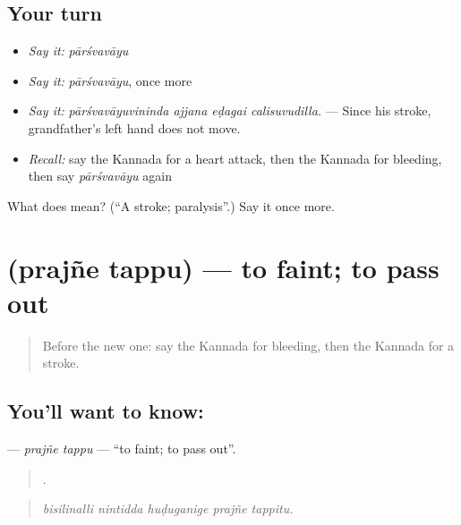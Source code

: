 \subsection*{Your turn}
\begin{itemize}
\raggedright
  \item \emph{Say it:} \emph{pārśvavāyu}
  \item \emph{Say it:} \emph{pārśvavāyu}, once more
  \item \emph{Say it:} \emph{pārśvavāyuvininda ajjana eḍagai calisuvudilla.} — Since his stroke, grandfather's left hand does not move.
  \item \emph{Recall:} say the Kannada for a heart attack, then the Kannada for bleeding, then say \emph{pārśvavāyu} again
\end{itemize}

\begin{tcolorbox}[breakable,colback=teal!4,colframe=teal!35!black,title={Before you move on}]
What does  mean? (\textquotedblleft{}A stroke; paralysis\textquotedblright{}.) Say it once more.
\end{tcolorbox}
\section[\texorpdfstring{\kn{ಪ್ರಜ್ಞೆ} \kn{ತಪ್ಪು} (prajñe tappu)}{ಪ್ರಜ್ಞೆ ತಪ್ಪು (prajñe tappu)}]{  (prajñe tappu) — to faint; to pass out}

\label{lesson:KA-C512-prajne-tappu}



\begin{quote}
Before the new one: say the Kannada for bleeding, then the Kannada for a stroke.
\end{quote}

\subsection*{You'll want to know:  }
\textbf{ } — \emph{prajñe tappu} — \textquotedblleft{}to faint; to pass out\textquotedblright{}.

\begin{quote}
    .
\end{quote}

\begin{quote}
\emph{bisilinalli nintidda huḍuganige prajñe tappitu.}
\end{quote}

